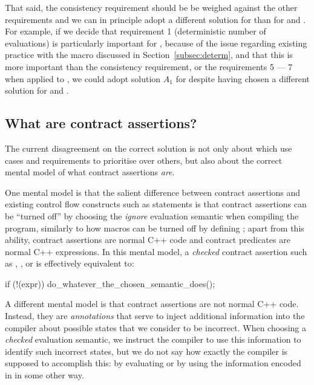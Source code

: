 That said, the consistency requirement should be be weighed against the other requirements and we can in principle adopt a different solution for   than for  and . For example, if we decide that requirement 1 (deterministic number of evaluations) is particularly important for , because of the issue regarding existing practice with the  macro discussed in Section~\ref{subsec:determ}, and that this is more important than the consistency requirement, or the requirements 5 --- 7 when applied to , we could adopt solution $A_1$ for  despite having chosen a different solution for  and .


\subsection{What are contract assertions?}

The current disagreement on the correct solution is  not only about which use cases and requirements to prioritise over others, but also about the correct mental model of what contract assertions \emph{are}.

One mental model is that the salient difference between contract assertions and existing control flow constructs such as  statements is that contract assertions can be ``turned off'' by choosing the \emph{ignore} evaluation semantic when compiling the program, similarly to how  macros can be turned off by defining ; apart from this ability, contract assertions are normal C++ code and contract predicates are normal C++ expressions. In this mental model, a \emph{checked} contract assertion such as , , or  is effectively equivalent to:
\begin{codeblock}
if (!(expr))
  do_whatever_the_chosen_semantic_does();
\end{codeblock}

A different mental model is that contract assertions are not normal C++ code. Instead, they are \emph{annotations} that serve to inject additional information into the compiler about possible states that we consider to be incorrect. When choosing a \emph{checked} evaluation semantic, we instruct the compiler to use this information to identify such incorrect states, but we do not say how exactly the compiler is supposed to accomplish this: by evaluating  or by using the information encoded in  in some other way.

